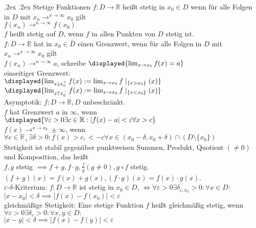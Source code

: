 \documentclass[9pt, landscape,a4paper]{extarticle}
\makeatletter
\renewcommand{\section}{\@startsection{section}{1}{0mm}%
                                {.2ex}%
                                {.2ex}%
                                {\sffamily\small\bfseries}}
\newcommand*\abs[1]{\lvert#1\rvert}
\newcommand\eps{\varepsilon}
\makeatother
\begin{document}
\begin{multicols*}{4}
  \section{Stetige Funktionen}
  $f: D\to\mathbb{R}$ heißt stetig in $x_0 \in D$ wenn für alle Folgen in $D$ mit $x_n \to^{x\rightarrow \infty} x_0$ gilt \\
  $f(x_n) \to^{n\rightarrow \infty} f(x_0)$ \\
  $f$ heißt stetig auf $D$, wenn $f$ in allen Punkten von $D$ stetig ist. \\
  $f:D\to\mathbb{R}$ hat in $x_0 \in \bar D$ einen Grenzwert, wenn für alle Folgen in $D$ mit $x_n \to^{x\rightarrow \infty} x_0$ gilt \\
  $f(x_n) \to^{n\rightarrow \infty} a$, schreibe $\displayed{\lim_{x\to x_0} f(x) = a}$ \\
  einseitiger Grenzwert: \\
  $\displayed{\lim_{x\downarrow x_0^+} f(x) := \lim_{x\to x_0}f\mid_{\{x > x_0\}}(x)}$ \\
  $\displayed{\lim_{x\uparrow x_0^-} f(x) := \lim_{x\to x_0}f\mid_{\{x < x_0\}}(x)}$ \\
  Asymptotik: $f:D \to \mathbb{R}, D$ unbeschränkt. \\
  $f$ hat Grenzwert $a$ in $\infty$, wenn \\
  $\displayed{\forall\eps > 0 \exists c\in\mathbb{R}: \abs{f(x) - a} < \eps \forall x > c}$ \\
  $f(x) \to^{x\rightarrow x_0} \pm \infty$, wenn $\forall c \in \mathbb{R}_+ \exists \delta >0: f(x) > c, < -c \forall x\in (x_0 - \delta, x_0 + \delta) \cap (D\setminus \{x_0\})$ \\
  Stetigkeit ist stabil gegenüber punktweisen Summen, Produkt, Quotient $(\neq 0)$ und Komposition, das heißt \\
  $f, g$ stetig $\implies f + g, f\cdot g, \frac{f}{g}(g\neq 0), g\circ f$ stetig. $(f + g)(x) = f(x) + g(x), (f\cdot g)(x) = f(x)\cdot g(x)$. \\
  $\eps$-$\delta$-Kriterium: $f: D \to \mathbb{R}$ ist stetig in $x_0 \in D$, $\iff \forall \eps > 0 \exists \delta_{\eps,x_0} > 0: \forall x\in D$: \\
  $\abs{x - x_0} < \delta \implies \abs{f(x) - f(x_0)} < \eps$ \\
  gleichmäßige Stetigkeit: Eine stetige Funktion $f$ heißt gleichmäßig stetig, wenn $\forall \eps > 0 \exists \delta_\eps >0 : \forall x, y \in D:$ \\
  $\abs{x - y} < \delta \implies \abs{f(x) - f(y)} < \eps$ \\

\end{multicols*}
\end{document}

